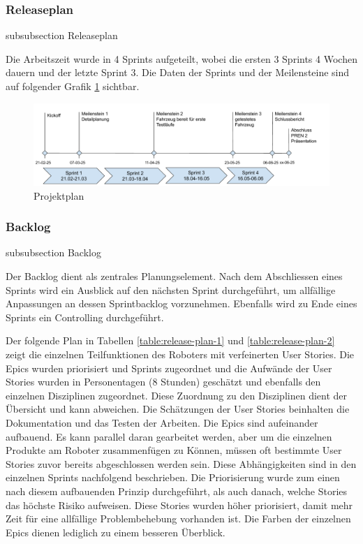 \subsubsection*{Releaseplan}
    {subsubsection}
    {Releaseplan}

Die Arbeitszeit wurde in 4 Sprints aufgeteilt, wobei die ersten 3 Sprints 4 Wochen dauern und der letzte Sprint 3. Die Daten der Sprints und der Meilensteine sind auf folgender Grafik \ref{fig:project-plan} sichtbar.


\begin{figure}[H]
\centering
\includegraphics[width=\textwidth]{assets/projektmanagement/projektplan.pdf}
\caption{Projektplan}
\label{fig:project-plan}
\end{figure}

\subsubsection*{Backlog}
    {subsubsection}
    {Backlog}
    
Der Backlog dient als zentrales Planungselement.
Nach dem Abschliessen eines Sprints wird ein Ausblick auf den nächsten Sprint durchgeführt, um allfällige Anpassungen an dessen Sprintbacklog vorzunehmen. Ebenfalls wird zu Ende eines Sprints ein Controlling durchgeführt.

Der folgende Plan in Tabellen \ref{table:release-plan-1} und \ref{table:release-plan-2} zeigt die einzelnen Teilfunktionen des Roboters mit verfeinerten User Stories. Die Epics wurden priorisiert und Sprints zugeordnet und die Aufwände der User Stories wurden in Personentagen (8 Stunden) geschätzt und ebenfalls den einzelnen Disziplinen zugeordnet. Diese Zuordnung zu den Disziplinen dient der Übersicht und kann abweichen.
Die Schätzungen der User Stories beinhalten die Dokumentation und das Testen der Arbeiten. Die Epics sind aufeinander aufbauend. Es kann parallel daran gearbeitet werden, aber um die einzelnen Produkte am Roboter zusammenfügen zu Können, müssen oft bestimmte User Stories zuvor bereits abgeschlossen werden sein. Diese Abhängigkeiten sind in den einzelnen Sprints nachfolgend beschrieben. Die Priorisierung wurde zum einen nach diesem aufbauenden Prinzip durchgeführt, als auch danach, welche Stories das höchste Risiko aufweisen. Diese Stories wurden höher priorisiert, damit mehr Zeit für eine allfällige Problembehebung vorhanden ist.
Die Farben der einzelnen Epics dienen lediglich zu einem besseren Überblick.


